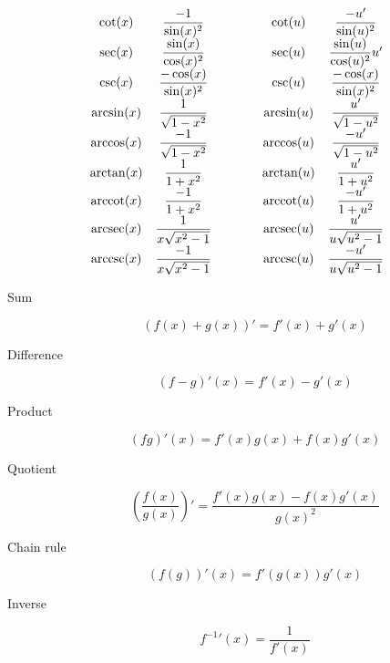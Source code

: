 \begin{tcolorbox}[hbox, title=Basic derivatives]
\begin{minipage}{0.7\textwidth}
\[\begin{array}{ccccc}
  \cot(x)      & \dfrac{-1}{\sin(x)^2}         & \qquad & \cot(u)      & \dfrac{-u'}{\sin(u)^2}\\
  \sec(x)      & \dfrac{\sin(x)}{\cos(x)^2}    & \qquad & \sec(u)      & \dfrac{\sin(u)}{\cos(u)^2}u'\\
  \csc(x)      & \dfrac{-\cos(x)}{\sin(x)^2}   & \qquad & \csc(u)      & \dfrac{-\cos(x)}{\sin(x)^2}\\
  \arcsin(x)   & \dfrac{1}{\sqrt{1-x^2}}       & \qquad & \arcsin(u)   & \dfrac{u'}{\sqrt{1-u^2}}\\
  \arccos(x)   & \dfrac{-1}{\sqrt{1-x^2}}      & \qquad & \arccos(u)   & \dfrac{-u'}{\sqrt{1-u^2}}\\
  \arctan(x)   & \dfrac{1}{1+x^2}              & \qquad & \arctan(u)   & \dfrac{u'}{1+u^2}\\
  \operatorname{arccot}(x)   & \dfrac{-1}{1+x^2}             & \qquad & \operatorname{arccot}(u)   & \dfrac{-u'}{1+u^2}\\
  \operatorname{arcsec}(x)   & \dfrac{1}{x\sqrt{x^2-1}}      & \qquad & \operatorname{arcsec}(u)   & \dfrac{u'}{u\sqrt{u^2-1}}\\
  \operatorname{arccsc}(x)   & \dfrac{-1}{x\sqrt{x^2-1}}     & \qquad & \operatorname{arccsc}(u)   & \dfrac{-u'}{u\sqrt{u^2-1}}  
\end{array}
\]
\end{minipage}
\end{tcolorbox}

\begin{tcolorbox}[hbox, title=Derivative rules]
  \begin{minipage}{0.5\textwidth}
    \begin{description}
      \item[Sum]
      \[
        (f(x)+g(x))' = f'(x) + g'(x)
      \]
      \item[Difference]
      \[
        (f-g)'(x) = f'(x) - g'(x)
      \]
      \item[Product]
      \[
        (fg)'(x) = f'(x)g(x) + f(x)g'(x)
      \]
      \item[Quotient]
      \[
        \left(\frac{f(x)}{g(x)}\right)' = \frac{f'(x)g(x) - f(x)g'(x)}{g(x)^2}
      \]
      \item[Chain rule]
      \[
        (f(g))'(x) = f'(g(x))g'(x)
      \]
      \item[Inverse]
      \[
        f^{-1}'(x) = \frac{1}{f'(x)}
      \]
    \end{description}
  \end{minipage}
\end{tcolorbox}